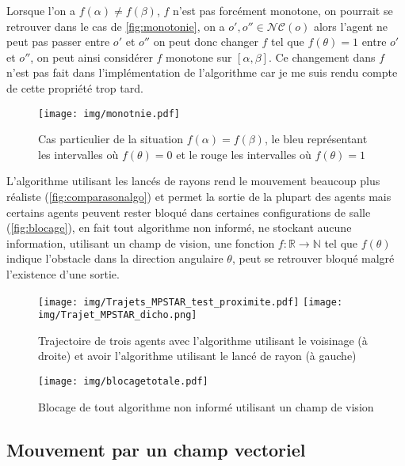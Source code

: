 \documentclass{article}
\newcommand{\noncontour}{\mathcal{NC}}
\newcommand{\R}{\mathbb{R}}
\newcommand{\N}{\mathbb{N}}
\begin{document}
Lorsque l'on a $f(\alpha) \neq f(\beta)$, $f$ n'est pas forcément
monotone, on pourrait se retrouver dans le cas de
\autoref{fig:monotonie}, on a $o', o'' \in \noncontour(o)$ alors
l'agent ne peut pas passer entre $o'$ et $o''$ on peut donc changer
$f$ tel que $f(\theta) = 1$ entre $o'$ et $o''$, on peut ainsi
considérer $f$ monotone sur $[\alpha, \beta]$. Ce changement
dans $f$ n'est pas fait dans l'implémentation de l'algorithme
car je me suis rendu compte de cette propriété trop tard.

\begin{figure}[h]
  \centering
  \texttt{[image: img/monotnie.pdf]}
  \caption{Cas particulier de la situation $f(\alpha) = f(\beta)$,
    le bleu représentant les intervalles où $f(\theta) = 0$ et le rouge
    les intervalles où $f(\theta) = 1$}
  \label{fig:monotonie}
\end{figure}

L'algorithme utilisant les lancés de rayons rend le mouvement beaucoup
plus réaliste (\autoref{fig:comparasonalgo}) et permet la sortie de la
plupart des agents mais certains agents peuvent rester bloqué 
dans certaines configurations de salle (\autoref{fig:blocage}), en fait
tout algorithme non informé, ne stockant aucune information,
utilisant un champ de vision, une fonction
$f : \R \to \N$ tel que $f(\theta)$ indique l'obstacle dans la direction
angulaire $\theta$, peut se retrouver bloqué malgré l'existence d'une
sortie.

\begin{figure}[h]
  \centering
  \texttt{[image: img/Trajets\_MPSTAR\_test\_proximite.pdf]}
  \texttt{[image: img/Trajet\_MPSTAR\_dicho.png]}
  \caption{Trajectoire de trois agents avec l'algorithme utilisant
    le voisinage (à droite) et avoir l'algorithme utilisant le
    lancé de rayon (à gauche)}
  \label{fig:comparasonalgo}
\end{figure}

\begin{figure}[h]
  \centering
  \texttt{[image: img/blocagetotale.pdf]}
  \caption{Blocage de tout algorithme non informé utilisant
    un champ de vision}
  \label{fig:blocage}
\end{figure}

\subsection{Mouvement par un champ vectoriel}
\end{document}
